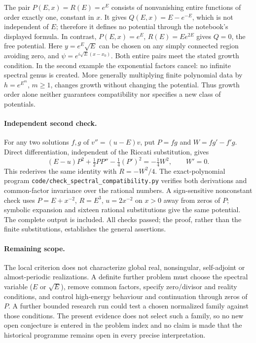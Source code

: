 \begin{example}
The pair \(P(E,x)=R(E)=e^E\) consists of nonvanishing entire functions of
order exactly one, constant in \(x\). It gives
\(Q(E,x)=E-e^{-E}\), which is not independent of \(E\); therefore it defines
no potential through the notebook's displayed formula. In contrast,
\(P(E,x)=e^E\), \(R(E)=Ee^{2E}\) gives \(Q=0\), the free potential. Here
\(y=e^E\sqrt E\) can be chosen on any simply connected region avoiding zero,
and \(\psi=e^{i\sqrt E(x-x_0)}\). Both entire pairs meet the stated growth
condition. In the second example the exponential factors cancel: no infinite
spectral genus is created. More generally multiplying finite polynomial data
by \(h=e^{E^m}\), \(m\ge1\), changes growth without changing the potential.
Thus growth order alone neither guarantees compatibility nor specifies a
new class of potentials.
\end{example}

\paragraph{Independent second check.}
For any two solutions \(f,g\) of \(v''=(u-E)v\), put \(P=fg\) and
\(W=fg'-f'g\). Direct differentiation, independent of the Riccati substitution,
gives
\[
 (E-u)P^2+\tfrac12PP''-\tfrac14(P')^2=-\tfrac14W^2,
 \qquad W'=0.
\]
This rederives the same identity with \(R=-W^2/4\). The exact-polynomial
program \texttt{code/check\_spectral\_compatibility.py} verifies both derivations
and common-factor invariance over the rational numbers. A sign-sensitive
nonconstant check uses \(P=E+x^{-2}\), \(R=E^3\), \(u=2x^{-2}\) on \(x>0\)
away from zeros of \(P\); symbolic expansion and sixteen rational substitutions
give the same potential. \oursComputed{} The complete output is included. All
checks passed; the proof, rather than the finite substitutions, establishes the
general assertions.

\paragraph{Remaining scope.}
The local criterion does not characterize global real, nonsingular,
self-adjoint or almost-periodic realizations. A definite further problem must
choose the spectral variable (\(E\) or \(\sqrt E\)), remove common factors,
specify zero/divisor and reality conditions, and control high-energy behaviour
and continuation through zeros of \(P\). A further bounded research run could
test a chosen normalized family against those conditions. The present evidence
does not select such a family, so no new open conjecture is entered in the
problem index and no claim is made that the historical programme remains open
in every precise interpretation.



